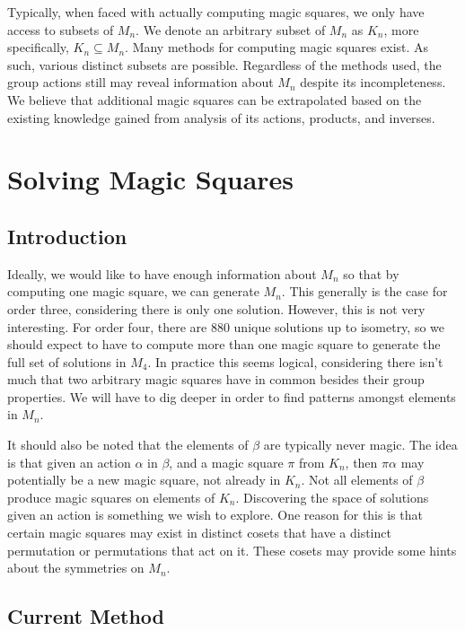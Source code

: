 \documentclass[12pt]{report}
\begin{document}
\par Typically, when faced with actually computing magic squares, we only have access to subsets of
$M_n$. We denote an arbitrary subset of $M_n$ as $K_n$, more specifically, $K_n \subseteq M_n$.
Many methods for computing magic squares exist. As such, various distinct subsets are possible.
Regardless of the methods used, the group actions still may reveal information about $M_n$ despite
its incompleteness. We believe that additional magic squares can be extrapolated based on the
existing knowledge gained from analysis of its actions, products, and inverses.

\chapter{Solving Magic Squares}

\section{Introduction}

\par Ideally, we would like to have enough information about $M_n$ so that by computing one magic
square, we can generate $M_n$. This generally is the case for order three, considering there is
only one solution. However, this is not very interesting. For order four, there are 880 unique
solutions up to isometry, so we should expect to have to compute more than one magic square to
generate the full set of solutions in $M_4$. In practice this seems logical, considering there
isn't much that two arbitrary magic squares have in common besides their group properties. We will
have to dig deeper in order to find patterns amongst elements in $M_n$.

\par It should also be noted that the elements of $\beta$ are typically never magic. The idea is
that given an action $\alpha$ in $\beta$, and a magic square $\pi$ from $K_n$, then $\pi\alpha$ may
potentially be a new magic square, not already in $K_n$. Not all elements of $\beta$ produce magic
squares on elements of $K_n$. Discovering the space of solutions given an action is something we
wish to explore. One reason for this is that certain magic squares may exist in distinct cosets
that have a distinct permutation or permutations that act on it. These cosets may provide some
hints about the symmetries on $M_n$.

\section{Current Method}
\end{document}
